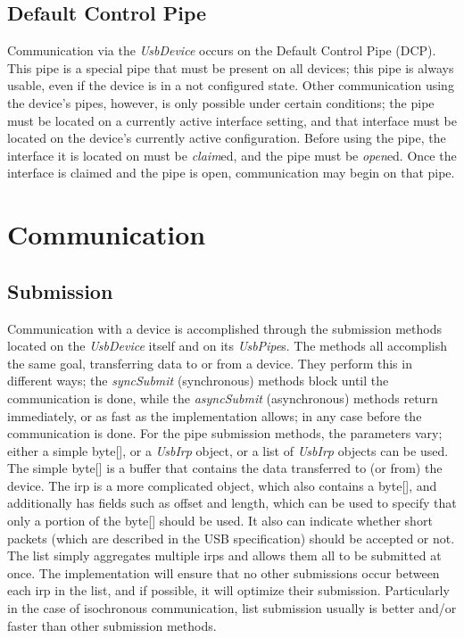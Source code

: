 \documentclass{article}
\newcommand{\myinterface}[1]{\emph{#1}}
\newcommand{\mymethod}[1]{\emph{#1}}
\newcommand{\mysectionend}[0]{\vfill\pagebreak[1]}
\begin{document}
\subsection{Default Control Pipe}

Communication via the \myinterface{UsbDevice} occurs on the Default Control Pipe (DCP).
This pipe is a special pipe that must be present on all devices; this
pipe is always usable, even if the device is in a not configured state.  Other
communication using the device's pipes, however, is only possible under certain
conditions; the pipe must be located on a currently active interface setting, and
that interface must be located on the device's currently active configuration.
Before using the pipe, the interface it is located on must be \mymethod{claim}ed,
and the pipe must be \mymethod{open}ed.  Once the interface is claimed and the
pipe is open, communication may begin on that pipe.

\mysectionend

%

\section{Communication}

\subsection{Submission}

Communication with a device is accomplished through the submission methods
located on the \myinterface{UsbDevice} itself and on its \myinterface{UsbPipe}s.
The methods all accomplish the same goal, transferring data to or from a device.
They perform this in different ways; the \mymethod{syncSubmit} (synchronous)
methods block until the communication is done, while the \mymethod{asyncSubmit}
(asynchronous) methods return immediately, or as fast as the implementation allows;
in any case before the communication is done.  For the pipe submission methods,
the parameters vary; either a simple byte[], or a \myinterface{UsbIrp} object,
or a list of \myinterface{UsbIrp} objects can be used.  The simple byte[]
is a buffer that contains the data transferred to (or from) the device.
The irp is a more complicated object, which also contains a byte[], and
additionally has fields such as offset and length, which can be used
to specify that only a portion of the byte[] should be used.  It also
can indicate whether short packets (which are described in the USB specification)
should be accepted or not.  The list simply aggregates multiple irps and
allows them all to be submitted at once.  The implementation will ensure
that no other submissions occur between each irp in the list, and if possible,
it will optimize their submission.  Particularly in the case of isochronous
communication, list submission usually is better and/or faster than
other submission methods.
\end{document}
